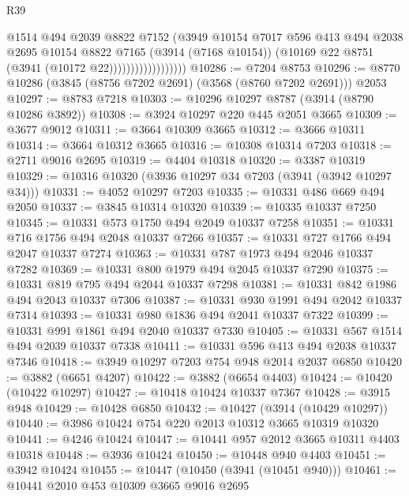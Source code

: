 \begin{lexlean}{R39}
\begin{coremodule}
                                @1514
                                @494
                                @2039
                                @8822
                                @7152
                                (@3949
                                  @10154
                                  @7017
                                  @596
                                  @413
                                  @494
                                  @2038
                                  @2695
                                  @10154
                                  @8822
                                  @7165
                                  (@3914 (@7168 @10154))
                                  (@10169 @22 @8751 (@3941 (@10172 @22))))))))))))))))))
@10286 := @7204 @8753
@10296 := @8770 @10286 (@3845 (@8756 @7202 @2691) (@3568 (@8760 @7202 @2691))) @2053
@10297 := @8783 @7218
@10303 := @10296 @10297 @8787 (@3914 (@8790 @10286 @3892))
@10308 := @3924 @10297 @220 @445 @2051 @3665
@10309 := @3677 @9012
@10311 := @3664 @10309 @3665
@10312 := @3666 @10311
@10314 := @3664 @10312 @3665
@10316 := @10308 @10314 @7203
@10318 := @2711 @9016 @2695
@10319 := @4404 @10318
@10320 := @3387 @10319
@10329 := @10316 @10320 (@3936 @10297 @34 @7203 (@3941 (@3942 @10297 @34)))
@10331 := @4052 @10297 @7203
@10335 := @10331 @486 @669 @494 @2050
@10337 := @3845 @10314 @10320
@10339 := @10335 @10337 @7250
@10345 := @10331 @573 @1750 @494 @2049 @10337 @7258
@10351 := @10331 @716 @1756 @494 @2048 @10337 @7266
@10357 := @10331 @727 @1766 @494 @2047 @10337 @7274
@10363 := @10331 @787 @1973 @494 @2046 @10337 @7282
@10369 := @10331 @800 @1979 @494 @2045 @10337 @7290
@10375 := @10331 @819 @795 @494 @2044 @10337 @7298
@10381 := @10331 @842 @1986 @494 @2043 @10337 @7306
@10387 := @10331 @930 @1991 @494 @2042 @10337 @7314
@10393 := @10331 @980 @1836 @494 @2041 @10337 @7322
@10399 := @10331 @991 @1861 @494 @2040 @10337 @7330
@10405 := @10331 @567 @1514 @494 @2039 @10337 @7338
@10411 := @10331 @596 @413 @494 @2038 @10337 @7346
@10418 := @3949 @10297 @7203 @754 @948 @2014 @2037 @6850
@10420 := @3882 (@6651 @4207)
@10422 := @3882 (@6654 @4403)
@10424 := @10420 (@10422 @10297)
@10427 := @10418 @10424 @10337 @7367
@10428 := @3915 @948
@10429 := @10428 @6850
@10432 := @10427 (@3914 (@10429 @10297))
@10440 := @3986 @10424 @754 @220 @2013 @10312 @3665 @10319 @10320
@10441 := @4246 @10424
@10447 := @10441 @957 @2012 @3665 @10311 @4403 @10318
@10448 := @3936 @10424
@10450 := @10448 @940 @4403
@10451 := @3942 @10424
@10455 := @10447 (@10450 (@3941 (@10451 @940)))
@10461 := @10441 @2010 @453 @10309 @3665 @9016 @2695

\end{coremodule}
\end{lexlean}
